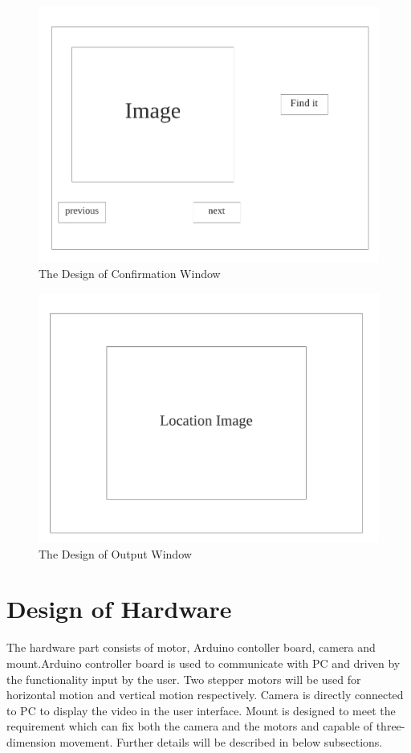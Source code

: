 \documentclass[12pt, titlepage]{article}
\begin{document}
\begin{figure}[H]
    \centering
    \includegraphics[scale=0.6]{list.png}
    \caption{The Design of Confirmation Window}
\end{figure}

\begin{figure}[H]
    \centering
    \includegraphics[scale=0.6]{output.png}
    \caption{The Design of Output Window}
\end{figure}

\section{Design of Hardware}
The hardware part consists of motor, Arduino contoller board, camera and mount.Arduino controller board is used to communicate with PC and driven by the functionality input by the user. Two stepper motors will be used for horizontal motion and vertical motion respectively. Camera is directly connected to PC to display the video in the user interface. Mount is designed to meet the requirement which can fix both the camera and the motors and capable of three-dimension movement. Further details will be described in below subsections.
\end{document}
